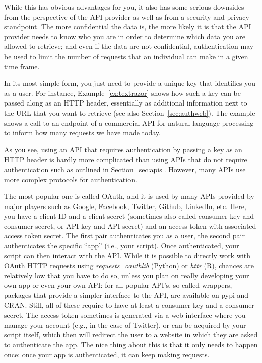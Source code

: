 While this has obvious advantages for you, it also has some serious
downsides from the perspective of the API provider as well as from
a security and privacy standpoint. The more confidential the data is,
the more likely it is that the API provider needs to know who you
are in order to determine which data you are allowed to retrieve;
and even if the data are not confidential, authentication may be
used to limit the number of requests that an individual can make
in a given time frame.

In its most simple form, you just need to provide a unique key that
identifies you as a user. For instance, Example~\ref{ex:textrazor} shows how
such a key can be passed along as an HTTP header, essentially as
additional information next to the URL that you want to retrieve (see
also Section~\ref{sec:authweb}). The example shows a call to an endpoint
of a commercial API for natural language processing to inform how
many requests we have made today.


As you see, using an API that requires authentication by passing a key
as an HTTP header is hardly more complicated than using APIs that do
not require authentication such as outlined in Section~\ref{sec:apis}.
However, many APIs use more complex protocols for authentication.

The most popular one is called OAuth, and it is used by many APIs
provided by major players such as Google, Facebook, Twitter, Github,
LinkedIn, etc. Here, you have a client ID and a client secret
(sometimes also called consumer key and consumer secret, or API key and API secret) and an
access token with associated access token secret. The first pair
authenticates you as a user, the second pair authenticates the
specific ``app'' (i.e., your script). Once authenticated, your
script can then interact with the API. While it is possible to
directly work with OAuth HTTP requests using \emph{requests\_oauthlib}
(Python) or \emph{httr} (R), chances are relatively low that you
have to do so, unless you plan on really developing your own app
or even your own API: for all popular API's, so-called wrappers,
packages that provide a simpler interface to the API, are available
on pypi and CRAN. Still, all of these require to have at least
a consumer key and a consumer secret. The access token sometimes
is generated via a web interface where you manage your account
(e.g., in the case of Twitter), or can be acquired by your script
itself, which then will redirect the user to a website in which
they are asked to authenticate the app. The nice thing about this
is that it only needs to happen once: once your app is authenticated,
it can keep making requests.




